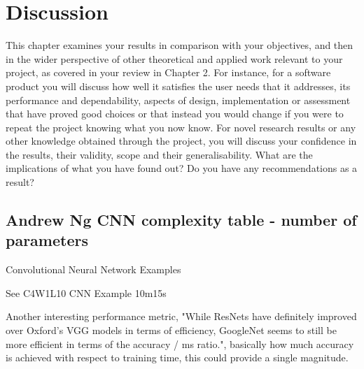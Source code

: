 
\chapter{Discussion}

\label{Discussion} 

This chapter examines your results in comparison with your objectives, and then in the wider perspective of other theoretical and applied work relevant to your project, as covered in your review in Chapter 2. For instance, for a software product you will discuss how well it satisfies the user needs that it addresses, its performance and dependability, aspects of design, implementation or assessment that have proved good choices or that instead you would change if you were to repeat the project knowing what you now know. For novel research results or any other knowledge obtained through the project, you will discuss your confidence in the results, their validity, scope and their generalisability. What are the implications of what you have found out? Do you have any recommendations as a result?

\section{Andrew Ng CNN complexity table - number of parameters}
Convolutional Neural Network Examples    
  
See C4W1L10 CNN Example 10m15s  

Another interesting performance metric, "While ResNets have definitely improved over Oxford’s VGG models in terms of efficiency, GoogleNet seems to still be more efficient in terms of the accuracy / ms ratio.", basically how much accuracy is achieved with respect to training time, this could provide a single magnitude.